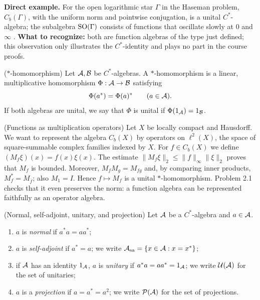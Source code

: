 \begin{investigacion}
\textbf{Direct example.} For the open logarithmic star $\Gamma$ in the Haseman
problem, $C_b(\Gamma)$, with the uniform norm and pointwise conjugation, is a
unital $C^*$-algebra; the subalgebra $\operatorname{SO}(\Gamma)$ consists of functions that
oscillate slowly at $0$ and $\infty$ \cite[§1, p.~464]{Karlovich2017}.
\textbf{What to recognize:} both are function algebras of the type just
defined; this observation only illustrates the $C^*$-identity and plays no
part in the course proofs.
\end{investigacion}

\begin{cthdefinicion}{($*$-homomorphism)}
Let $\mathcal A,\mathcal B$ be $C^*$-algebras. A $*$-homomorphism is a linear, multiplicative
homomorphism $\Phi:\mathcal A\to\mathcal B$ satisfying
\[
 \Phi(a^*)=\Phi(a)^*\qquad(a\in\mathcal A).
\]
If both algebras are unital, we say that $\Phi$ is unital if $\Phi(1_\mathcal A)=1_\mathcal B$.
\end{cthdefinicion}

\begin{cthejemplo}{(Functions as multiplication operators)}
Let $X$ be locally compact and Hausdorff. We want to represent the algebra
$C_b(X)$ by operators on $\ell^2(X)$, the space of square-summable complex
families indexed by $X$. For $f\in C_b(X)$ we define
$(M_f\xi)(x)=f(x)\xi(x)$. The estimate
$\|M_f\xi\|_2\le\|f\|_\infty\|\xi\|_2$ proves that $M_f$ is bounded.
Moreover, $M_fM_g=M_{fg}$ and, by comparing inner products,
$M_f^*=M_{\overline f}$; also $M_1=I$.
Hence $f\mapsto M_f$ is a unital $*$-homomorphism.
Problem 2.1 checks that it even preserves the norm: a function algebra
can be represented faithfully as an operator algebra.
\end{cthejemplo}

\begin{cthdefinicion}{(Normal, self-adjoint, unitary, and projection)}
Let $\mathcal A$ be a $C^*$-algebra and $a\in\mathcal A$.
\begin{enumerate}[label=(\roman*)]
\item $a$ is \emph{normal} if $a^*a=aa^*$;
\item $a$ is \emph{self-adjoint} if $a^*=a$; we write
$\mathcal A_{\mathrm{sa}}=\{x\in\mathcal A:x=x^*\}$;
\item if $\mathcal A$ has an identity $1_\mathcal A$, $a$ is \emph{unitary} if
$a^*a=aa^*=1_\mathcal A$; we write $\mathcal U(\mathcal A)$ for the set of unitaries;
\item $a$ is a \emph{projection} if $a=a^*=a^2$; we write
$\mathcal P(\mathcal A)$ for the set of projections.
\end{enumerate}
\end{cthdefinicion}

